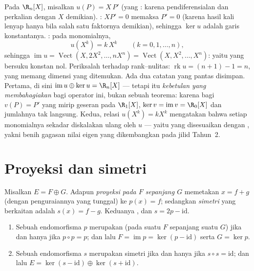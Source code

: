 \begin{example}
\label{ex:b1:linmaps:euler}
Pada $\R_n[X]$, misalkan $u(P) = X\,P'$ (yang : karena pendiferensialan dan
perkalian dengan $X$ demikian). \emph{}: $XP' = 0$ memaksa $P' =
0$ (karena hasil kali  lenyap hanya bila salah satu faktornya demikian),
sehingga $\ker u$ adalah garis konstantanya. \emph{}: pada
 monomialnya,
\[
u(X^k) = k\,X^{k} \qquad (k = 0, 1, \dots, n),
\]
sehingga $\operatorname{im} u = \operatorname{Vect}(X, 2X^2, \dots,
nX^n) = \operatorname{Vect}(X, X^2, \dots, X^n)$: yaitu
 yang bersuku konstan nol. Periksalah terhadap rank--nulitas:
$\operatorname{rk} u = (n + 1) - 1 = n$, yang memang
dimensi yang ditemukan. Ada dua catatan yang pantas disimpan. Pertama, di sini
$\operatorname{im} u \oplus \ker u = \R_n[X]$ --- tetapi itu
\emph{kebetulan yang membahagiakan} bagi operator ini, bukan sebuah teorema: karena bagi
$v(P) = P'$ yang mirip geseran pada $\R_1[X]$, $\ker v = \operatorname{im}
v = \R_0[X]$ dan jumlahnya tak langsung. Kedua, relasi
$u(X^k) = kX^k$ mengatakan bahwa setiap monomialnya sekadar diskalakan ulang oleh $u$ ---
yaitu  yang disesuaikan dengan , yakni benih gagasan nilai eigen
yang dikembangkan pada jilid Tahun~2.
\end{example}

\section{Proyeksi dan simetri}

\begin{definition}\label{def:b1:linmaps:projection}
Misalkan $E = F \oplus G$. Adapun \emph{proyeksi pada $F$ sepanjang
$G$} memetakan $x = f + g$ (dengan penguraiannya yang tunggal) ke
$p(x) = f$; sedangkan \emph{simetri} yang berkaitan adalah $s(x)
= f - g$. Keduanya , dan $s = 2p - \mathrm{id}$.
\end{definition}

\begin{theorem}\label{thm:b1:linmaps:projchar}
\begin{enumerate}
  \item Sebuah endomorfisma $p$ merupakan  (pada suatu $F$ sepanjang
        suatu $G$) jika dan hanya jika $p \circ p = p$; dan lalu $F =
        \operatorname{im} p = \ker(p - \mathrm{id})$ serta $G = \ker
        p$.
  \item Sebuah endomorfisma $s$ merupakan simetri jika dan hanya jika $s \circ s
        = \mathrm{id}$; dan lalu $E = \ker(s - \mathrm{id}) \oplus
        \ker(s + \mathrm{id})$.
\end{enumerate}
\end{theorem}

